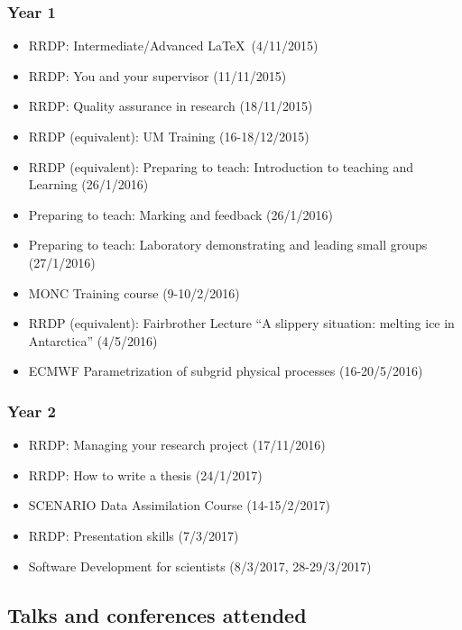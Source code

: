 \documentclass[11pt,a4paper]{article}
\begin{document}
\subsubsection*{Year 1}

\begin{itemize}
  \item RRDP: Intermediate/Advanced \LaTeX\ (4/11/2015)
  \item RRDP: You and your supervisor (11/11/2015)
  \item RRDP: Quality assurance in research (18/11/2015)
  \item RRDP (equivalent): UM Training (16-18/12/2015)
  \item RRDP (equivalent): Preparing to teach: Introduction to teaching and Learning (26/1/2016)
  \item Preparing to teach: Marking and feedback (26/1/2016)
  \item Preparing to teach: Laboratory demonstrating and leading small groups (27/1/2016)
  \item MONC Training course (9-10/2/2016)
  \item RRDP (equivalent): Fairbrother Lecture ``A slippery situation: melting ice in Antarctica'' (4/5/2016)
  \item ECMWF Parametrization of subgrid physical processes (16-20/5/2016)
\end{itemize}

\subsubsection*{Year 2}

\begin{itemize}
  \item RRDP: Managing your research project (17/11/2016)
  \item RRDP: How to write a thesis (24/1/2017)
  \item SCENARIO Data Assimilation Course (14-15/2/2017)
  \item RRDP: Presentation skills (7/3/2017)
  \item Software Development for scientists (8/3/2017, 28-29/3/2017)
\end{itemize}

\subsection*{Talks and conferences attended}
\end{document}
